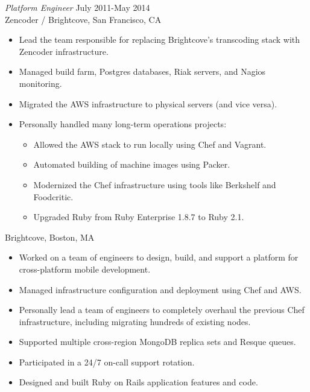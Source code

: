 \documentclass[line,margin]{res}
\begin{document}
\begin{resume}
  {\sl Platform Engineer}  \hfill July 2011-May 2014 \\
  Zencoder /  Brightcove,
  San Francisco, CA
  \begin{itemize}  \itemsep -2pt %
    \item Lead the team responsible for replacing Brightcove's transcoding stack with Zencoder infrastructure.
    \item Managed build farm, Postgres databases, Riak servers, and Nagios monitoring.
    \item Migrated the AWS infrastructure to physical servers (and vice versa).
    \item Personally handled many long-term operations projects:

    \vspace{-2.5mm} %
    \begin{itemize}  \itemsep -3pt %
      \item Allowed the AWS stack to run locally using Chef and Vagrant.
      \item Automated building of machine images using Packer.
      \item Modernized the Chef infrastructure using tools like Berkshelf and Foodcritic.
      \item Upgraded Ruby from Ruby Enterprise 1.8.7 to Ruby 2.1.
    \end{itemize}
  \end{itemize}
  
  \vspace{-4mm} %
  Brightcove,
  Boston, MA
  \begin{itemize}  \itemsep -2pt %
    \item Worked on a team of engineers to design, build, and support a platform for cross-platform mobile development.
    \item Managed infrastructure configuration and deployment using Chef and AWS.
    \item Personally lead a team of engineers to completely overhaul the previous Chef infrastructure, including migrating hundreds of existing nodes.
    \item Supported multiple cross-region MongoDB replica sets and Resque queues.
    \item Participated in a 24/7 on-call support rotation.
    \item Designed and built Ruby on Rails application features and code.
  \end{itemize}


\end{resume}
\end{document}
